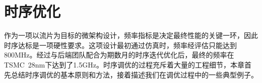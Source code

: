 \chapter{时序优化}\label{chap:timing}
作为一项以流片为目标的微架构设计，频率指标是决定最终性能的关键一环，因此时序达标是一项硬性要求。这项设计最初通过仿真时，频率经评估只能达到800MHz。经过与后端团队配合为期数月的时序迭代优化后，最终的频率在TSMC~28nm下达到了1.5GHz。时序调优的过程充斥着大量的工程细节，本章首先总结时序调优的基本原则和方法，接着描述我们在调优过程中的一些典型例子。